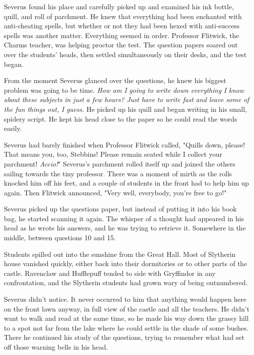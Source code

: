 Severus found his place and carefully picked up and examined his ink bottle, quill, and roll of parchment. He knew that everything had been enchanted with anti-cheating spells, but whether or not they had been hexed with anti-success spells was another matter. Everything seemed in order. Professor Flitwick, the Charms teacher, was helping proctor the test. The question papers soared out over the students' heads, then settled simultaneously on their desks, and the test began.

From the moment Severus glanced over the questions, he knew his biggest problem was going to be time. \emph{How am I going to write down everything I know about these subjects in just a few hours? Just have to write fast and leave some of the fun things out, I guess.} He picked up his quill and began writing in his small, spidery script. He kept his head close to the paper so he could read the words easily.

Severus had barely finished when Professor Flitwick called, "Quills down, please! That means you, too, Stebbins! Please remain seated while I collect your parchment! \emph{Accio!}" Severus's parchment rolled itself up and joined the others sailing towards the tiny professor. There was a moment of mirth as the rolls knocked him off his feet, and a couple of students in the front had to help him up again. Then Flitwick announced, "Very well, everybody, you're free to go!"

Severus picked up the questions paper, but instead of putting it into his book bag, he started scanning it again. The whisper of a thought had appeared in his head as he wrote his answers, and he was trying to retrieve it. Somewhere in the middle, between questions 10 and 15.

Students spilled out into the sunshine from the Great Hall. Most of Slytherin house vanished quickly, either back into their dormitories or to other parts of the castle. Ravenclaw and Hufflepuff tended to side with Gryffindor in any confrontation, and the Slytherin students had grown wary of being outnumbered.

Severus didn't notice. It never occurred to him that anything would happen here on the front lawn anyway, in full view of the castle and all the teachers. He didn't want to walk and read at the same time, so he made his way down the grassy hill to a spot not far from the lake where he could settle in the shade of some bushes. There he continued his study of the questions, trying to remember what had set off those warning bells in his head.

